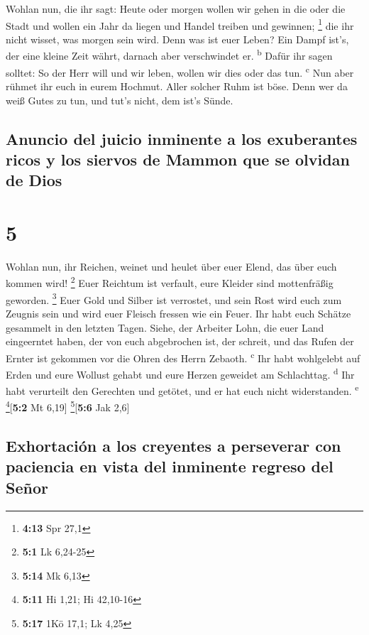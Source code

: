  Wohlan nun, die ihr sagt: Heute oder morgen wollen wir
gehen in die oder die Stadt und wollen ein Jahr da liegen und Handel
treiben und gewinnen; \footnote{\textbf{4:13} Spr 27,1} 
die ihr nicht wisset, was morgen sein wird. Denn was ist euer Leben? Ein
Dampf ist's, der eine kleine Zeit währt, darnach aber verschwindet er.
\textsuperscript{b}  Dafür ihr sagen solltet: So der Herr
will und wir leben, wollen wir dies oder das tun. \textsuperscript{c}
 Nun aber rühmet ihr euch in eurem Hochmut. Aller solcher
Ruhm ist böse.  Denn wer da weiß Gutes zu tun, und tut's
nicht, dem ist's Sünde.

\hypertarget{anuncio-del-juicio-inminente-a-los-exuberantes-ricos-y-los-siervos-de-mammon-que-se-olvidan-de-dios}{%
\subsection{Anuncio del juicio inminente a los exuberantes ricos y los
siervos de Mammon que se olvidan de
Dios}\label{anuncio-del-juicio-inminente-a-los-exuberantes-ricos-y-los-siervos-de-mammon-que-se-olvidan-de-dios}}

\hypertarget{section-4}{%
\section{5}\label{section-4}}

 Wohlan nun, ihr Reichen, weinet und heulet über euer
Elend, das über euch kommen wird! \footnote{\textbf{5:1} Lk 6,24-25}
 Euer Reichtum ist verfault, eure Kleider sind
mottenfräßig geworden. \footnote{\textbf{5:14} Mk 6,13} 
Euer Gold und Silber ist verrostet, und sein Rost wird euch zum Zeugnis
sein und wird euer Fleisch fressen wie ein Feuer. Ihr habt euch Schätze
gesammelt in den letzten Tagen.  Siehe, der Arbeiter Lohn,
die euer Land eingeerntet haben, der von euch abgebrochen ist, der
schreit, und das Rufen der Ernter ist gekommen vor die Ohren des Herrn
Zebaoth. \textsuperscript{c}  Ihr habt wohlgelebt auf
Erden und eure Wollust gehabt und eure Herzen geweidet am Schlachttag.
\textsuperscript{d}  Ihr habt verurteilt den Gerechten und
getötet, und er hat euch nicht widerstanden. \textsuperscript{e}
\footnote{\textbf{5:11} Hi 1,21; Hi 42,10-16}{[}\textbf{5:2} Mt 6,19{]}
\footnote{\textbf{5:17} 1Kö 17,1; Lk 4,25}{[}\textbf{5:6} Jak 2,6{]}

\hypertarget{exhortaciuxf3n-a-los-creyentes-a-perseverar-con-paciencia-en-vista-del-inminente-regreso-del-seuxf1or}{%
\subsection{Exhortación a los creyentes a perseverar con paciencia en
vista del inminente regreso del
Señor}\label{exhortaciuxf3n-a-los-creyentes-a-perseverar-con-paciencia-en-vista-del-inminente-regreso-del-seuxf1or}}

